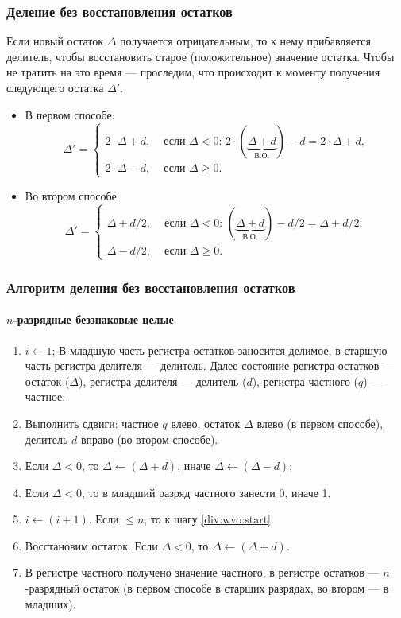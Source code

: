 \begin{frame}
    \frametitle{Деление без восстановления остатков}

    Если новый остаток $\Delta$ получается отрицательным, то к нему прибавляется делитель, чтобы восстановить старое (положительное) значение остатка. Чтобы не тратить на это время --- проследим, что происходит к моменту получения следующего остатка $\Delta'$.
    
    \begin{itemize}
        \item В первом способе: 
        \[
            \Delta' = 
                \begin{cases}
                    2\cdot\Delta + d, & \text{ если $\Delta<0$: $2\cdot(\underbrace{\Delta + d}_\text{В.О.}) - d = 2\cdot\Delta + d$,}\\
                    2\cdot\Delta - d, & \text{ если $\Delta\ge 0$.}
                \end{cases}
        \]
        \item Во втором способе:
        \[
            \Delta' = 
                \begin{cases}
                    \Delta + d/2, & \text{ если $\Delta<0$: $(\underbrace{\Delta + d}_\text{В.О.}) - d/2 = \Delta + d/2$,}\\
                    \Delta - d/2, & \text{ если $\Delta\ge 0$.}
                \end{cases}
        \]
    \end{itemize}
\end{frame}

\begin{frame}
    \frametitle{Алгоритм деления без восстановления остатков}
    \framesubtitle{$n$-разрядные беззнаковые целые}

    \begin{enumerate}
        \item $i\gets 1$; В младшую часть регистра остатков заносится делимое, в старшую часть регистра делителя --- делитель. Далее состояние регистра остатков --- остаток ($\Delta$), регистра делителя --- делитель ($d$), регистра частного ($q$) --- частное.
        \item\label{div:wvo:start} Выполнить сдвиги: частное $q$ влево, остаток $\Delta$ влево (в первом способе), делитель $d$ вправо (во втором способе).
        \item Если $\Delta < 0$, то $\Delta\gets(\Delta + d)$, иначе $\Delta\gets(\Delta - d)$;
        \item Если $\Delta < 0$, то в младший разряд частного занести 0, иначе 1.
        \item $i\gets (i + 1)$. Если $\le n$, то к шагу \ref{div:wvo:start}.
        \item Восстановим остаток. Если $\Delta < 0$, то $\Delta\gets(\Delta + d)$.
        \item В регистре частного получено значение частного, в регистре остатков --- $n$-разрядный остаток (в первом способе в старших разрядах, во втором --- в младших).
    \end{enumerate}
\end{frame}

